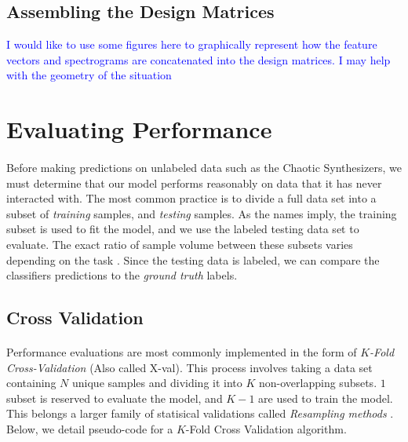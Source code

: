 \documentclass[12pt,letterpaper]{article}
\begin{document}

\subsection{Assembling the Design Matrices}
\label{subsec-AssembleXs}

\textcolor{blue}{I would like to use some figures here to graphically represent how the feature vectors and spectrograms are concatenated into the design matrices. I may help with the geometry of the situation}




\newpage
\section{Evaluating Performance}
\label{sec-PerfEval}

\paragraph*{}Before making predictions on unlabeled data such as the Chaotic Synthesizers, we must determine that our model performs reasonably on data that it has never interacted with. The most common practice is to divide a full data set into a subset of \textit{training} samples, and \textit{testing} samples. As the names imply, the training subset is used to fit the model, and we use the labeled testing data set to evaluate. The exact ratio of sample volume between these subsets varies depending on the task \cite{Goodfellow,Geron2,Mitchell}. Since the testing data is labeled, we can compare the classifiers predictions to the \textit{ground truth} labels.


\subsection{Cross Validation}
\label{subsec-XValidation}

\paragraph*{}Performance evaluations are most commonly implemented in the form of \textit{$K$-Fold Cross-Validation} (Also called X-val). This process involves taking a data set containing $N$ unique samples and dividing it into $K$ non-overlapping subsets. $1$ subset is reserved to evaluate the model, and $K-1$ are used to train the model. This belongs a larger family of statisical validations called \textit{Resampling methods} \cite{James}. Below, we detail pseudo-code for a $K$-Fold Cross Validation algorithm.
\end{document}
